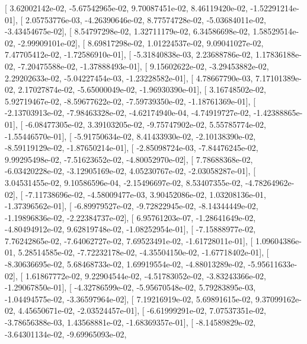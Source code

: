 \documentclass{article}
\begin{document}
       [  3.62002142e-02,  -5.67542965e-02,   9.70087451e-02,
          8.46119420e-02,  -1.52291214e-01],
       [  2.05753776e-03,  -4.26390646e-02,   8.77574728e-02,
         -5.03684011e-02,  -3.43454675e-02],
       [  8.54797298e-02,   1.32711179e-02,   6.34586698e-02,
          1.58529514e-02,  -2.99909101e-02],
       [  8.69817298e-02,   1.01224537e-02,   9.09041027e-02,
          7.47705412e-02,  -1.72586910e-01],
       [ -5.31840838e-03,   2.23688786e-02,   1.17836188e-02,
         -7.20475588e-02,  -1.37888493e-01],
       [  9.15602622e-02,  -3.29453882e-02,   2.29202633e-02,
         -5.04227454e-03,  -1.23228582e-01],
       [  4.78667790e-03,   7.17101389e-02,   2.17027874e-02,
         -5.65000049e-02,  -1.96930390e-01],
       [  3.16748502e-02,   5.92719467e-02,  -8.59677622e-02,
         -7.59739350e-02,  -1.18761369e-01],
       [ -2.13703913e-02,  -7.98463328e-02,  -4.62174940e-04,
         -4.74919727e-02,  -1.42388865e-01],
       [ -6.08477305e-02,   3.39103205e-02,  -9.75747902e-02,
          5.55785774e-02,  -1.55446570e-01],
       [ -5.91750634e-02,   8.41433930e-02,  -2.10138390e-02,
         -8.59119129e-02,  -1.87650214e-01],
       [ -2.85098724e-03,  -7.84476245e-02,   9.99295498e-02,
         -7.51623652e-02,  -4.80052970e-02],
       [  7.78688368e-02,  -6.03420228e-02,  -3.12905169e-02,
          4.05230767e-02,  -2.03058287e-01],
       [  3.04531455e-02,   9.10586596e-04,  -2.15496697e-02,
          8.53407355e-02,  -4.78264962e-02],
       [ -7.11738696e-02,  -4.58009477e-03,   3.90452086e-02,
          1.03208136e-01,  -1.37396562e-01],
       [ -6.89979527e-02,  -9.72822945e-02,  -8.14344449e-02,
         -1.19896836e-02,  -2.22384737e-02],
       [  6.95761203e-07,  -1.28641649e-02,  -4.80494912e-02,
          9.62819748e-02,  -1.08252954e-01],
       [ -7.15888977e-02,   7.76242865e-02,  -7.64062727e-02,
          7.69523491e-02,  -1.61728011e-01],
       [  1.09604386e-01,   5.28514585e-02,  -7.72232178e-02,
         -4.35504150e-02,  -1.67718402e-01],
       [ -8.30636695e-02,   5.68468733e-02,   1.69919554e-02,
         -4.88013289e-02,  -5.95611633e-02],
       [  1.61867772e-02,   9.22904544e-02,  -4.51783052e-02,
         -3.83243366e-02,  -1.29067850e-01],
       [ -4.32786599e-02,  -5.95670548e-02,   5.79283895e-03,
         -1.04494575e-02,  -3.36597964e-02],
       [  7.19216919e-02,   5.69891615e-02,   9.37099162e-02,
          4.45650671e-02,  -2.03524457e-01],
       [ -6.61999291e-02,   7.07537351e-02,  -3.78656388e-03,
          1.43568881e-02,  -1.68369357e-01],
       [ -8.14589829e-02,  -3.64301134e-02,  -9.69965093e-02,
\end{document}
